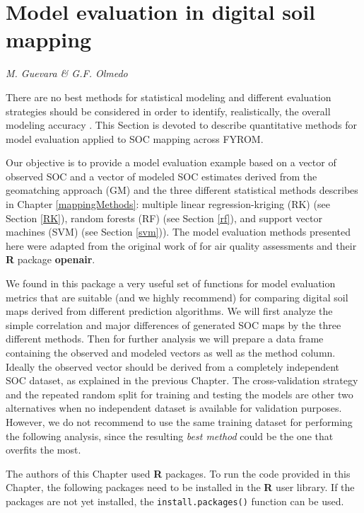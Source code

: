\documentclass[10pt,b5paper,]{book}
\theoremstyle{definition}
\theoremstyle{definition}
\theoremstyle{definition}
\theoremstyle{remark}
\begin{document}
\hypertarget{evaluation}{%
\chapter{Model evaluation in digital soil mapping}\label{evaluation}}

\emph{M. Guevara \& G.F. Olmedo}

There are no best methods for statistical modeling and different
evaluation strategies should be considered in order to identify,
realistically, the overall modeling accuracy
\citep{ho2002simple, qiao2015no, guevara_2018, nussbaum2018evaluation}.
This Section is devoted to describe quantitative methods for model
evaluation applied to SOC mapping across FYROM.

Our objective is to provide a model evaluation example based on a vector
of observed SOC and a vector of modeled SOC estimates derived from the
geomatching approach (GM) and the three different statistical methods
describes in Chapter \ref{mappingMethods}: multiple linear
regression-kriging (RK) (see Section \ref{RK}), random forests (RF) (see
Section \ref{rf}), and support vector machines (SVM) (see Section
\ref{svm})). The model evaluation methods presented here were adapted
from the original work of \citet{openair} for air quality assessments
and their \textbf{R} package \textbf{openair}.

We found in this package a very useful set of functions for model
evaluation metrics that are suitable (and we highly recommend) for
comparing digital soil maps derived from different prediction
algorithms. We will first analyze the simple correlation and major
differences of generated SOC maps by the three different methods. Then
for further analysis we will prepare a data frame containing the
observed and modeled vectors as well as the method column. Ideally the
observed vector should be derived from a completely independent SOC
dataset, as explained in the previous Chapter. The cross-validation
strategy and the repeated random split for training and testing the
models are other two alternatives when no independent dataset is
available for validation purposes. However, we do not recommend to use
the same training dataset for performing the following analysis, since
the resulting \emph{best method} could be the one that overfits the
most.

The authors of this Chapter used \textbf{R} packages. To run the code
provided in this Chapter, the following packages need to be installed in
the \textbf{R} user library. If the packages are not yet installed, the
\texttt{install.packages()} function can be used.
\end{document}
